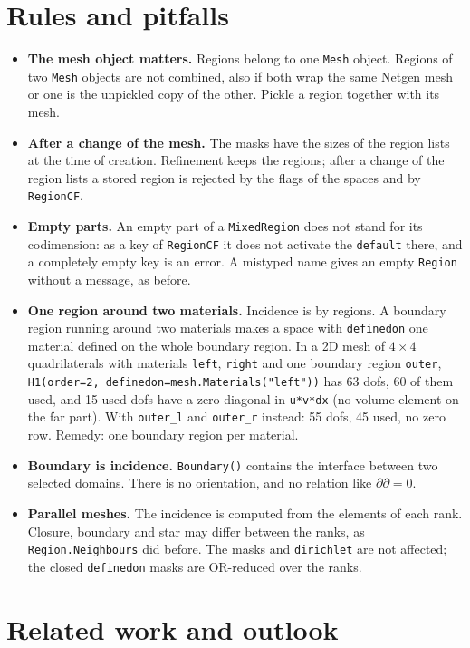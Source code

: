 \documentclass[10pt,a4paper]{article}
\newcommand{\code}[1]{\texttt{#1}}
\begin{document}
\section{Rules and pitfalls}

\begin{itemize}\setlength\itemsep{1pt}
\item \textbf{The mesh object matters.} Regions belong to one \code{Mesh} object. Regions of two \code{Mesh} objects are not combined, also if both wrap the same Netgen mesh or one is the unpickled copy of the other. Pickle a region together with its mesh.
\item \textbf{After a change of the mesh.} The masks have the sizes of the region lists at the time of creation. Refinement keeps the regions; after a change of the region lists a stored region is rejected by the flags of the spaces and by \code{RegionCF}.
\item \textbf{Empty parts.} An empty part of a \code{MixedRegion} does not stand for its codimension: as a key of \code{RegionCF} it does not activate the \code{default} there, and a completely empty key is an error. A mistyped name gives an empty \code{Region} without a message, as before.
\item \textbf{One region around two materials.} Incidence is by regions. A boundary region running around two materials makes a space with \code{definedon} one material defined on the whole boundary region. In a 2D mesh of $4\times4$ quadrilaterals with materials \code{left}, \code{right} and one boundary region \code{outer}, \code{H1(order=2, definedon=mesh.Materials("left"))} has 63 dofs, 60 of them used, and 15 used dofs have a zero diagonal in \code{u*v*dx} (no volume element on the far part). With \code{outer\_l} and \code{outer\_r} instead: 55 dofs, 45 used, no zero row. Remedy: one boundary region per material.
\item \textbf{Boundary is incidence.} \code{Boundary()} contains the interface between two selected domains. There is no orientation, and no relation like $\partial\partial = 0$.
\item \textbf{Parallel meshes.} The incidence is computed from the elements of each rank. Closure, boundary and star may differ between the ranks, as \code{Region.Neighbours} did before. The masks and \code{dirichlet} are not affected; the closed \code{definedon} masks are OR-reduced over the ranks.
\end{itemize}

\section{Related work and outlook}
\end{document}
